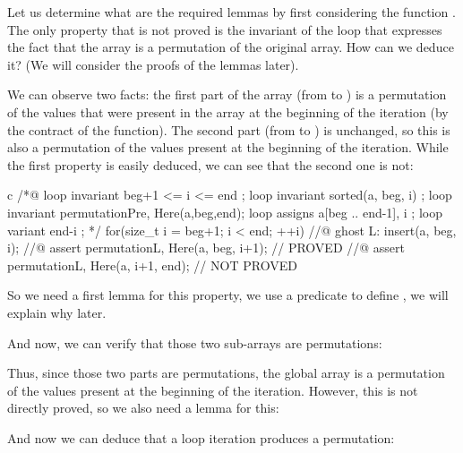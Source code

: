 Let us determine what are the required lemmas by first considering the function
. The only property that is not proved is the invariant
of the loop that expresses the fact that the array is a permutation of the
original array. How can we deduce it? (We will consider the proofs of the lemmas
later).




We can observe two facts: the first part of the array (from  to
) is a permutation of the values that were present in the array
at the beginning of the iteration (by the contract of the 
function). The second part (from  to ) is
unchanged, so this is also a permutation of the values present at the beginning
of the iteration. While the first property is easily deduced, we can see that
the second one is not:



\begin{CodeBlock}{c}
  /*@
    loop invariant beg+1 <= i <= end ;
    loop invariant sorted(a, beg, i) ;
    loop invariant permutation{Pre, Here}(a,beg,end);
    loop assigns a[beg .. end-1], i ;
    loop variant end-i ;
  */
  for(size_t i = beg+1; i < end; ++i) {
    //@ ghost L:
    insert(a, beg, i);
    //@ assert permutation{L, Here}(a, beg, i+1); // PROVED
    //@ assert permutation{L, Here}(a, i+1, end); // NOT PROVED
  }
\end{CodeBlock}

So we need a first lemma for this property, we use a predicate
 to define , we will explain why
later.


And now, we can verify that those two sub-arrays are permutations:




Thus, since those two parts are permutations, the global array is a permutation
of the values present at the beginning of the iteration. However, this is not
directly proved, so we also need a lemma for this:





And now we can deduce that a loop iteration produces a permutation:



